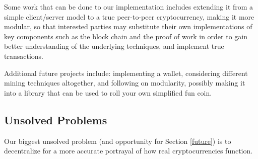 \documentclass[12pt]{article}
\begin{document}
Some work that can be done to our implementation includes extending it from a simple client/server model to a true peer-to-peer cryptocurrency, making it more modular, so that interested parties may substitute their own implementations of key components such as the block chain and the proof of work in order to gain better understanding of the underlying techniques, and implement true transactions. 

Additional future projects include: implementing a wallet, considering different mining techniques altogether, and following on modularity, possibly making it into a library that can be used to roll your own simplified fun coin.

\subsection{Unsolved Problems}\label{unsolved}
Our biggest unsolved problem (and opportunity for Section \ref{future}) is to decentralize for a more accurate portrayal of how real cryptocurrencies function.



\end{document}
